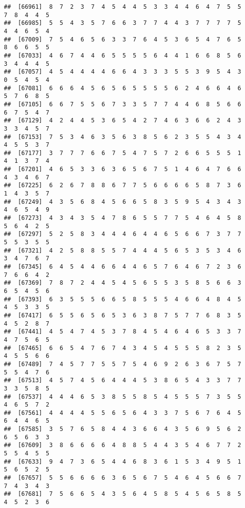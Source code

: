 \documentclass[
]{book}
\begin{document}
\begin{verbatim}
##  [66961]  8  7  2  3  7  4  5  4  4  5  3  3  4  4  6  4  7  5  5  7  8  4  4  5
##  [66985]  5  5  4  3  5  7  6  6  3  7  7  4  4  3  7  7  7  7  5  4  4  6  5  4
##  [67009]  7  5  4  6  5  6  3  3  7  6  4  5  3  6  5  4  7  6  5  8  6  6  5  5
##  [67033]  4  6  7  4  4  6  5  5  5  5  6  4  4  1  6  6  8  5  6  3  4  4  4  5
##  [67057]  4  5  4  4  4  4  6  6  4  3  3  3  5  5  3  9  5  4  3  0  5  4  5  4
##  [67081]  6  6  6  4  5  6  5  6  5  5  5  5  6  2  4  6  6  4  6  5  7  6  8  5
##  [67105]  6  6  7  5  5  6  7  3  3  5  7  7  4  4  6  8  5  6  6  6  7  5  4  7
##  [67129]  4  2  4  4  5  3  6  5  4  2  7  4  6  3  6  6  2  4  3  3  3  4  5  7
##  [67153]  7  5  3  4  6  3  5  6  3  8  5  6  2  3  5  5  4  3  4  4  5  5  3  7
##  [67177]  3  7  7  7  6  6  7  5  4  7  5  7  2  6  6  5  5  5  1  4  1  3  7  4
##  [67201]  4  6  5  3  3  6  3  6  5  6  7  5  1  4  6  4  7  6  6  4  3  4  6  7
##  [67225]  6  2  6  7  8  8  6  7  7  5  6  6  6  6  5  8  7  3  6  1  4  3  5  7
##  [67249]  4  3  5  6  8  4  5  6  6  5  8  3  5  9  5  4  3  4  3  4  6  5  4  9
##  [67273]  4  3  4  3  5  4  7  8  6  5  5  7  7  5  4  6  4  5  8  5  6  4  2  5
##  [67297]  5  2  5  8  3  4  4  4  6  4  4  6  5  6  6  7  3  7  7  5  5  3  5  5
##  [67321]  4  2  5  8  8  5  5  7  4  4  4  5  6  5  3  5  3  4  6  3  4  7  6  7
##  [67345]  6  4  5  4  4  6  6  4  4  6  5  7  6  4  6  7  2  3  6  7  6  6  4  2
##  [67369]  7  8  7  2  4  4  5  4  5  6  5  5  3  5  8  5  6  6  3  6  5  4  5  6
##  [67393]  6  3  5  5  5  6  6  5  8  5  5  5  4  6  6  4  8  4  5  4  5  3  3  5
##  [67417]  6  5  5  6  5  6  5  3  6  3  8  7  5  7  7  6  8  3  5  4  5  2  8  7
##  [67441]  4  5  4  7  4  5  3  7  8  4  5  4  6  4  6  5  3  3  7  4  7  5  6  5
##  [67465]  6  6  5  4  7  6  7  4  3  4  5  4  5  5  5  8  2  3  5  4  5  5  6  6
##  [67489]  7  4  5  7  7  5  5  7  5  4  6  9  2  6  3  6  7  5  7  5  5  4  7  6
##  [67513]  4  5  7  4  5  6  4  4  4  5  3  8  6  5  4  3  3  7  7  3  3  5  8  5
##  [67537]  4  4  4  6  5  3  8  5  5  8  5  4  5  5  5  7  3  5  5  4  6  5  7  2
##  [67561]  4  4  4  4  5  5  6  5  6  4  3  3  7  5  6  7  6  4  5  6  4  4  6  5
##  [67585]  3  5  7  6  5  8  4  4  3  6  6  4  3  5  6  9  5  6  2  6  5  6  3  3
##  [67609]  3  8  6  6  6  6  4  8  8  5  4  4  3  5  4  6  7  7  2  5  5  4  5  5
##  [67633]  9  4  7  3  6  5  4  4  6  8  3  6  1  5  3  4  9  5  1  5  6  5  2  5
##  [67657]  5  5  6  6  6  6  3  6  5  6  7  5  4  6  4  5  6  6  7  7  4  3  4  3
##  [67681]  7  5  6  6  5  4  3  5  6  4  5  8  5  4  5  6  5  8  5  4  5  2  3  6

\end{verbatim}
\end{document}
